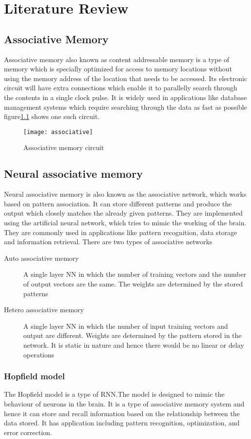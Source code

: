 \chapter{Literature Review}
\section{Associative Memory}
Associative memory also known as content addressable memory is a type of memory
which is specially optimized for access to memory locations without using the
memory address of the location that needs to be accessed. Its electronic
circuit will have extra connections which enable it to parallelly search
through the contents in a single clock pulse. It is widely used in applications
like database management systems which require searching through the data as
fast as possible figure\ref{associative_circuit} shows one such circuit.
\begin{figure}[h!]
    \centering
    \texttt{[image: associative]}
    \caption{Associative memory circuit}\label{associative_circuit}
\end{figure}

\section{Neural associative memory}
Neural associative memory is also known as the associative network, which works
based on pattern association. It can store different patterns and produce the
output which closely matches the already given patterns. They are implemented
using the artificial neural network, which tries to mimic the working of the
brain. They are commonly used in applications like pattern recognition, data
storage and information retrieval. There are two types of associative networks
\begin{description}
    \item[Auto associative memory]A single layer NN in which the number of training
    vectors and the number of output vectors are the same. The weights are
    determined by the stored patterns
    \item[Hetero associative memory]A single layer NN in which the number of input
    training vectors and output are different. Weights are determined by the
    pattern stored in the network. It is static in nature and hence there would be
    no linear or delay operations
\end{description}

\subsection{Hopfield model}
The Hopfield model\cite{hopfield} is a type of RNN.\@ The model is designed to
mimic the behaviour of neurons in the brain. It is a type of associative memory
system and hence it can store and recall information based on the relationship
between the data stored. It has application including pattern recognition,
optimization, and error correction.

